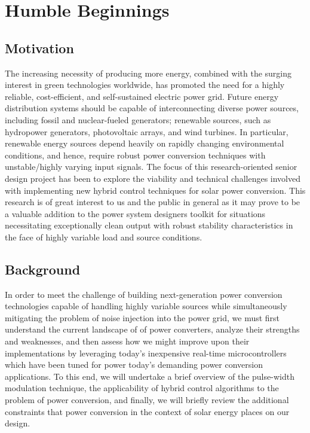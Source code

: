 
\chapter{Humble Beginnings} %

\label{Chapter1} %


\section{Motivation}

The increasing necessity of producing more energy, combined with the surging
interest in green technologies worldwide, has promoted the need for a highly
reliable, cost-efficient, and self-sustained electric power grid. Future energy distribution
systems should be capable of interconnecting diverse power sources,
including fossil and nuclear-fueled generators; renewable sources, such as hydropower
generators, photovoltaic arrays, and wind turbines. In particular, renewable energy sources depend heavily on
rapidly changing environmental conditions, and hence, require robust power conversion techniques with unstable/highly varying input signals\cite{91}. The focus of this research-oriented senior design project has been to explore the viability and technical challenges involved with implementing new hybrid control techniques for solar power conversion. This research is of great interest to us and the public in general as it may prove to be a valuable addition to the power system designers toolkit for situations necessitating exceptionally clean output with robust stability characteristics in the face of highly variable load and source conditions.


\section{Background}
In order to meet the challenge of building next-generation power conversion technologies capable of handling highly variable sources while simultaneously mitigating the problem of noise injection into the power grid, we must first understand the current landscape of of power converters, analyze their strengths and weaknesses, and then assess how we might improve upon their implementations by leveraging today's inexpensive real-time microcontrollers which have been tuned for power today's demanding power conversion applications. To this end, we will undertake a brief overview of the pulse-width modulation technique, the applicability of hybrid control algorithms to the problem of power conversion, and finally, we will briefly review the additional constraints that power conversion in the context of solar energy places on our design. 

